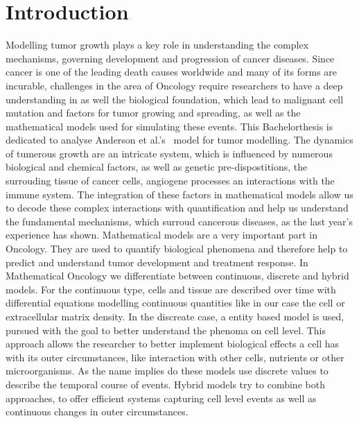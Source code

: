 \section{Introduction}
Modelling tumor growth plays a key role in understanding the complex mechanisms, governing development and progression of cancer diseases. Since cancer is one of the leading death causes worldwide and many of its forms are incurable, challenges in the area of Oncology require researchers to have a deep understanding in as well the biological foundation, which lead to malignant cell mutation and factors for tumor growing and spreading, as well as the 
mathematical models used for simulating these events. This Bachelorthesis is dedicated to analyse Anderson et al.'s~\cite{anderson_continuous_1998,anderson_mathematical_2000} model for tumor modelling.\newline
The dynamics of tumerous growth are an intricate system, which is influenced by numerous biological and chemical factors, as well as genetic pre-dispostitions, the surrouding tissue of cancer cells, angiogene processes an interactions with the immune system. The integration of these factors in mathematical models allow us to decode these complex interactions with quantification and help us understand the fundamental mechanisms, which surroud cancerous diseases, as the last year's experience has shown. \newline 
Mathematical models are a very important part in Oncology. They are used to quantify biological phenomena and therefore help to predict and understand tumor development and treatment response. In Mathematical Oncology we differentiate between continuous, discrete and hybrid models. For the continuous type, cells and tissue are described over time with differential equations modelling continuous quantities like in our case the cell or extracellular matrix density. In the discreate case, a entity based model is used, pursued with the goal to better understand the phenoma on cell level. This approach allows the researcher to better implement biological effects a cell has with its outer circumstances, like interaction with other cells, nutrients or other microorganisms. As the name implies do these models use discrete values to describe the temporal course of events. Hybrid models try to combine both approaches, to offer efficient systems capturing cell level events as well as continuous changes in outer circumstances.\newline 
